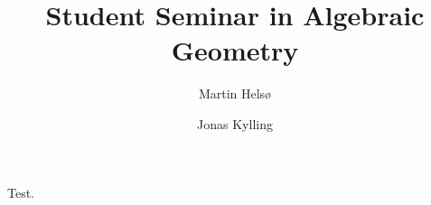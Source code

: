 \documentclass[a4paper, UKenglish]{report}
\title
{
    \bfseries\sffamily
    Student Seminar in Algebraic Geometry
}
\author
{
    Martin Hels\o
    \and
    Jonas Kylling
}
\begin{document}
\begin{titlepage}
    \maketitle
\end{titlepage}


\begin{theorem}
	Test.
\end{theorem}

\clearpage
\printbibliography
\end{document}
